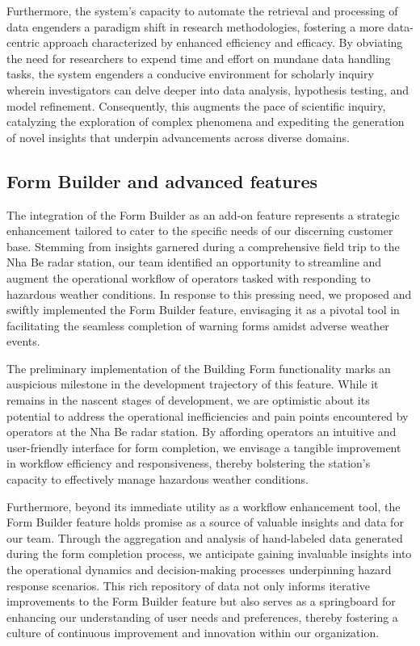 Furthermore, the system's capacity to automate the retrieval and processing of
data engenders a paradigm shift in research methodologies, fostering a more
data-centric approach characterized by enhanced efficiency and efficacy. By
obviating the need for researchers to expend time and effort on mundane data
handling tasks, the system engenders a conducive environment for scholarly
inquiry wherein investigators can delve deeper into data analysis, hypothesis
testing, and model refinement. Consequently, this augments the pace of
scientific inquiry, catalyzing the exploration of complex phenomena and
expediting the generation of novel insights that underpin advancements across
diverse domains.


\subsection{Form Builder and advanced features}
The integration of the Form Builder as an add-on feature represents a strategic
enhancement tailored to cater to the specific needs of our discerning customer
base. Stemming from insights garnered during a comprehensive field trip to the
Nha Be radar station, our team identified an opportunity to streamline and
augment the operational workflow of operators tasked with responding to
hazardous weather conditions. In response to this pressing need, we proposed and
swiftly implemented the Form Builder feature, envisaging it as a pivotal tool in
facilitating the seamless completion of warning forms amidst adverse weather
events.

The preliminary implementation of the Building Form functionality marks an
auspicious milestone in the development trajectory of this feature. While it
remains in the nascent stages of development, we are optimistic about its
potential to address the operational inefficiencies and pain points encountered
by operators at the Nha Be radar station. By affording operators an intuitive
and user-friendly interface for form completion, we envisage a tangible
improvement in workflow efficiency and responsiveness, thereby bolstering the
station's capacity to effectively manage hazardous weather conditions.

Furthermore, beyond its immediate utility as a workflow enhancement tool, the
Form Builder feature holds promise as a source of valuable insights and data for
our team. Through the aggregation and analysis of hand-labeled data generated
during the form completion process, we anticipate gaining invaluable insights
into the operational dynamics and decision-making processes underpinning hazard
response scenarios. This rich repository of data not only informs iterative
improvements to the Form Builder feature but also serves as a springboard for
enhancing our understanding of user needs and preferences, thereby fostering a
culture of continuous improvement and innovation within our organization.

